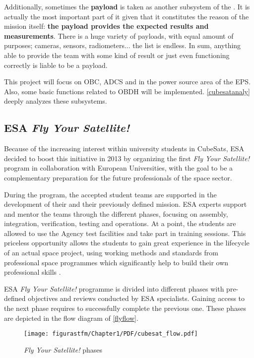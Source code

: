 Additionally, sometimes the \textbf{payload} is taken as another subsystem of the . It is actually the most important part of it given that it constitutes the reason of the mission itself: \textbf{the payload provides the expected results and measurements}. There is a huge variety of payloads, with equal amount of purposes; cameras, sensors, radiometers... the list is endless. In sum, anything able to provide the team with some kind of result or just even functioning correctly is liable to be a payload.

This project will focus on \acrshort{OBC}, \acrshort{ADCS} and in the power source area of the \acrshort{EPS}. Also, some basic functions related to \acrshort{OBDH} will be implemented. \autoref{cubesatanaly} deeply analyzes these subsystems.


\subsection{ESA \textit{Fly Your Satellite!}} \label{fys}

Because of the increasing interest within university students in CubeSats, \acrshort{ESA} decided to boost this initiative in 2013 by organizing the first \textit{Fly Your Satellite!} program in collaboration with European Universities, with the goal to be a complementary preparation for the future professionals of the space sector.

During the program, the accepted student teams are supported in the development of their  and their previously defined mission. \acrshort{ESA} experts support and mentor the teams through the different phases, focusing on assembly, integration, verification, testing and operations. At a point, the students are allowed to use the Agency test facilities and take part in training sessions. This priceless opportunity allows the students to gain great experience in the lifecycle of an actual space project, using working methods and standards from professional space programmes which significantly help to build their own professional skills \cite{ESA}.

ESA \textit{Fly Your Satellite!} programme is divided into different phases with pre-defined objectives and reviews conducted by \acrshort{ESA} specialists. Gaining access to the next phase requires to successfully complete the previous one. These phases are depicted in the flow diagram of \autoref{flyflow}.

\begin{figure}[H]
				\centering
				\texttt{[image: figurastfm/Chapter1/PDF/cubesat\_flow.pdf]}
				\caption{\textit{Fly Your Satellite!} phases} 	\label{flyflow}
				\vspace{-1cm}
\end{figure}


